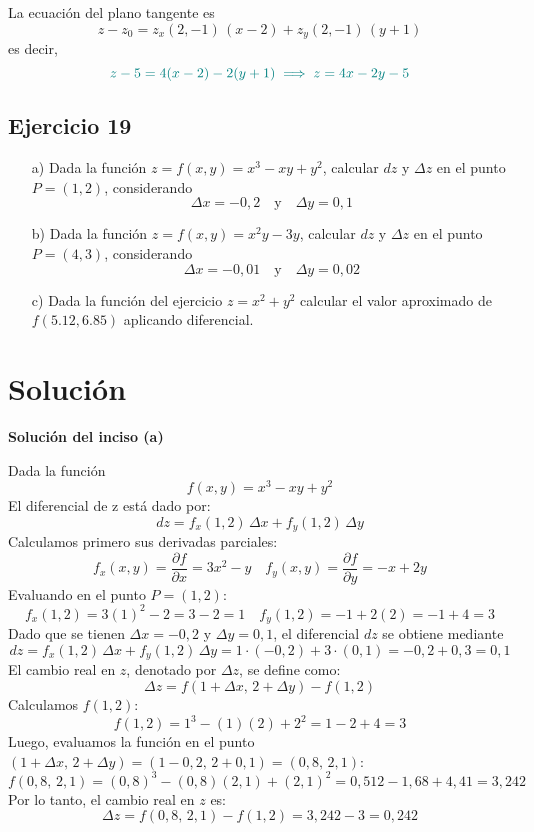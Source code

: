 \documentclass{article}
\begin{document}
La ecuación del plano tangente es
\[
z - z_0 = z_x(2,-1)\,(x - 2) + z_y(2,-1)\,(y + 1)
\]
es decir,
\[\color{teal}
z - 5 = 4(x - 2) - 2(y + 1)
\;\Longrightarrow\;
z = 4x - 2y - 5
\]



\newpage

\subsection{Ejercicio 19}

\begin{enumerate}
    \item[a)] Dada la función \( z = f(x, y) = x^3 - xy + y^2 \), calcular \( dz \) y \( \Delta z \) en el punto \( P = (1, 2) \), considerando
    \[
    \Delta x = -0{,}2 \quad \text{y} \quad \Delta y = 0{,}1
    \]
    
    \item[b)] Dada la función \( z = f(x, y) = x^2 y - 3y \), calcular \( dz \) y \( \Delta z \) en el punto \( P = (4, 3) \), considerando
    \[
    \Delta x = -0{,}01 \quad \text{y} \quad \Delta y = 0{,}02
    \]
    \item[c)]
     Dada la función del ejercicio $z=x^2+y^2$ calcular el valor aproximado de $f(5.12,6.85)$ aplicando diferencial.

\end{enumerate}



\newpage
\section*{Solución}

\noindent\textbf{Solución del inciso (a)}

Dada la función
\[
f(x,y)=x^3 - xy + y^2
\]
El diferencial de z está dado por:
\[
dz = f_x(1,2)\,\Delta x + f_y(1,2)\,\Delta y
\]
Calculamos primero sus derivadas parciales:
\[
f_x(x,y)=\frac{\partial f}{\partial x}=3x^2 - y \quad f_y(x,y)=\frac{\partial f}{\partial y}=-x + 2y
\]
Evaluando en el punto \(P=(1,2)\):
\[
f_x(1,2)=3(1)^2 - 2=3-2=1 \quad f_y(1,2)=-1+2(2)=-1+4=3
\]
Dado que se tienen \(\Delta x=-0{,}2\) y \(\Delta y=0{,}1\), el diferencial \(dz\) se obtiene mediante
{\color{teal}
\[
dz = f_x(1,2)\,\Delta x + f_y(1,2)\,\Delta y = 1\cdot(-0{,}2) + 3\cdot(0{,}1) = -0{,}2 + 0{,}3 = 0{,}1
\]
} %
El cambio real en \(z\), denotado por \(\Delta z\), se define como:
\[
\Delta z = f(1+\Delta x,\, 2+\Delta y) - f(1,2)
\]
Calculamos \(f(1,2)\):
\[
f(1,2)=1^3 - (1)(2) + 2^2 = 1 - 2 + 4 = 3
\]
Luego, evaluamos la función en el punto \((1+\Delta x,\, 2+\Delta y)=(1-0{,}2,\, 2+0{,}1)=(0{,}8,\,2{,}1)\):
\[
f(0{,}8,\,2{,}1) = (0{,}8)^3 - (0{,}8)(2{,}1) + (2{,}1)^2 = 0{,}512 - 1{,}68 + 4{,}41 = 3{,}242
\]
Por lo tanto, el cambio real en \(z\) es:
{\color{teal}
\[
\Delta z = f(0{,}8,\,2{,}1) - f(1,2) = 3{,}242 - 3 = 0{,}242
\]
} %
\end{document}
